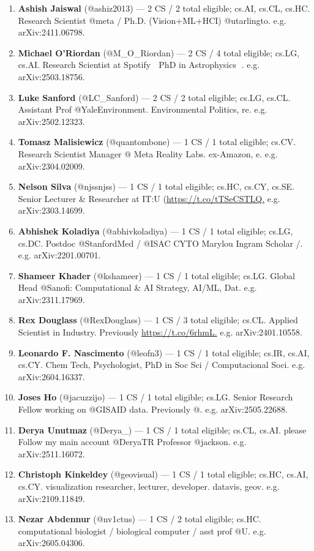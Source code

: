 \documentclass[twocolumn,10pt,letterpaper]{article}
\begin{document}
\begin{enumerate}
  \item \textbf{Ashish Jaiswal} (@ashiz2013) — 2 CS / 2 total eligible; cs.AI, cs.CL, cs.HC. Research Scientist @meta / Ph.D. (Vision+ML+HCI) @utarlingto. e.g. arXiv:2411.06798.
  \item \textbf{Michael O'Riordan} (@M\_O\_Riordan) — 2 CS / 4 total eligible; cs.LG, cs.AI. Research Scientist at Spotify 🎵 PhD in Astrophysics 🚀. e.g. arXiv:2503.18756.
  \item \textbf{Luke Sanford} (@LC\_Sanford) — 2 CS / 2 total eligible; cs.LG, cs.CL. Assistant Prof @YaleEnvironment.  Environmental Politics, re. e.g. arXiv:2502.12323.
  \item \textbf{Tomasz Malisiewicz} (@quantombone) — 1 CS / 1 total eligible; cs.CV. Research Scientist Manager @ Meta Reality Labs. ex-Amazon, e. e.g. arXiv:2304.02009.
  \item \textbf{Nelson Silva} (@njssnjss) — 1 CS / 1 total eligible; cs.HC, cs.CY, cs.SE. Senior Lecturer \& Researcher at IT:U (\url{https://t.co/tTSeCSTLQ.} e.g. arXiv:2303.14699.
  \item \textbf{Abhishek Koladiya} (@abhivkoladiya) — 1 CS / 1 total eligible; cs.LG, cs.DC. Postdoc  @StanfordMed / @ISAC CYTO Marylou Ingram Scholar /. e.g. arXiv:2201.00701.
  \item \textbf{Shameer Khader} (@kshameer) — 1 CS / 1 total eligible; cs.LG. Global Head @Sanofi: Computational \& AI Strategy, AI/ML, Dat. e.g. arXiv:2311.17969.
  \item \textbf{Rex Douglass} (@RexDouglass) — 1 CS / 3 total eligible; cs.CL. Applied Scientist in Industry. Previously \url{https://t.co/6rhmL.} e.g. arXiv:2401.10558.
  \item \textbf{Leonardo F. Nascimento} (@leofn3) — 1 CS / 1 total eligible; cs.IR, cs.AI, cs.CY. Chem Tech, Psychologist, PhD in Soc Sci / Computacional Soci. e.g. arXiv:2604.16337.
  \item \textbf{Joses Ho} (@jacuzzijo) — 1 CS / 1 total eligible; cs.LG. Senior Research Fellow working on @GISAID data. Previously @. e.g. arXiv:2505.22688.
  \item \textbf{Derya Unutmaz} (@Derya\_) — 1 CS / 1 total eligible; cs.CL, cs.AI. please Follow my main account @DeryaTR    Professor @jackson. e.g. arXiv:2511.16072.
  \item \textbf{Christoph Kinkeldey} (@geovisual) — 1 CS / 1 total eligible; cs.HC, cs.AI, cs.CY. visualization researcher, lecturer, developer. datavis, geov. e.g. arXiv:2109.11849.
  \item \textbf{Nezar Abdennur} (@nv1ctus) — 1 CS / 2 total eligible; cs.HC. computational biologist / biological computer / asst prof @U. e.g. arXiv:2605.04306.

\end{enumerate}
\end{document}
